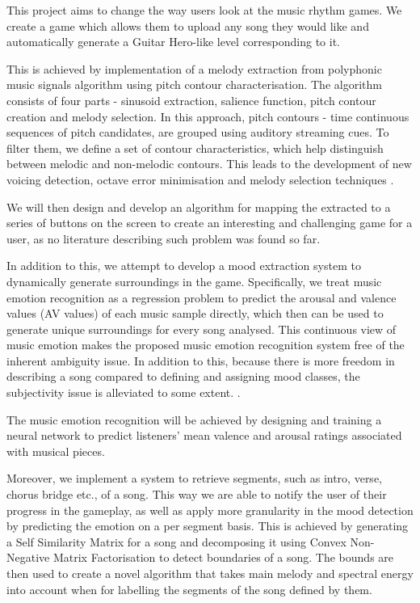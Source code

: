 This project aims to change the way users look at the music rhythm games. We create a game which allows them to upload any song they would like and automatically generate a Guitar Hero-like level corresponding to it. 

This is achieved by implementation of a melody extraction from polyphonic music signals algorithm using pitch contour characterisation. The algorithm consists of four parts - sinusoid extraction, salience function, pitch contour creation and melody selection. In this approach, pitch contours - time continuous sequences of pitch candidates, are grouped using auditory streaming cues. To filter them, we define a set of contour characteristics, which help distinguish between melodic and non-melodic contours. This leads to the development of new voicing detection, octave error minimisation and melody selection techniques \cite{salamon}.

We will then design and develop an algorithm for mapping the extracted to a series of buttons on the screen to create an interesting and challenging game for a user, as no literature describing such problem was found so far.

In addition to this, we attempt to develop a mood extraction system to dynamically generate surroundings in the game. Specifically, we treat music emotion recognition as a regression problem to predict the arousal and valence values (AV values) of each music sample directly, which then can be used to generate unique surroundings for every song analysed. This continuous view of music emotion makes the proposed music emotion recognition system free of the inherent ambiguity issue. In addition to this, because there is more freedom in describing a song compared to defining and assigning mood classes, the subjectivity issue is alleviated to some extent. \cite{mood}.

The music emotion recognition will be achieved by designing and training a neural network to predict listeners’ mean valence and arousal ratings associated with musical pieces.

Moreover, we implement a system to retrieve segments, such as intro, verse, chorus bridge etc.,  of a song. This way we are able to notify the user of their progress in the gameplay, as well as apply more granularity in the mood detection by predicting the emotion on a per segment basis.
This is achieved by generating a Self Similarity Matrix for a song and decomposing it using Convex Non-Negative Matrix Factorisation to detect boundaries of a song. The bounds are then used to create a novel algorithm that takes main melody and spectral energy into account when for labelling the segments of the song defined by them.

